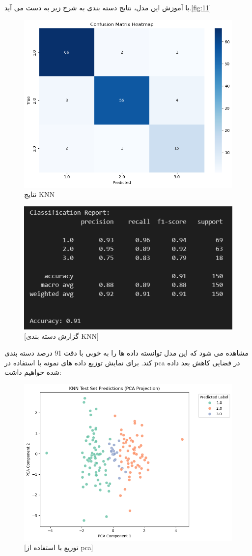 \documentclass{article}
\begin{document}
با آموزش این مدل، نتایج دسته بندی به شرح زیر به دست می آید.\autoref{fig:11}
\begin{figure}[h!]
	\centering
	\includegraphics[width=0.7\linewidth]{11}
	\caption[]{نتایج KNN}
	\label{fig:11}
\end{figure}
\clearpage
\begin{figure}[h!]
	\centering
	\includegraphics[width=0.7\linewidth]{12}
	\caption{[گزارش دسته بندی KNN]}
	\label{fig:12}
\end{figure}
\clearpage
مشاهده می شود که این مدل توانسته داده ها را به خوبی با دقت 91 درصد دسته بندی کند. برای نمایش توزیع داده های نمونه با استفاده در pca در فضایی کاهش بعد داده شده خواهیم داشت:
\begin{figure}[h!]
	\centering
	\includegraphics[width=0.7\linewidth]{13}
	\caption{[توزیع با استفاده از pca]}
	\label{fig:13}
\end{figure}
\end{document}
